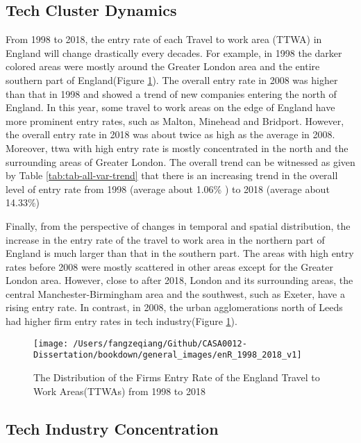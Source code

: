 \documentclass[
  12pt,
  oneside]{book}
\begin{document}
\hypertarget{tech-cluster-dynamics}{%
\subsection{Tech Cluster Dynamics}\label{tech-cluster-dynamics}}

From 1998 to 2018, the entry rate of each Travel to work area (TTWA) in England will change drastically every decades. For example, in 1998 the darker colored areas were mostly around the Greater London area and the entire southern part of England(Figure \ref{fig:fig-enR-1998-2018-v1}). The overall entry rate in 2008 was higher than that in 1998 and showed a trend of new companies entering the north of England. In this year, some travel to work areas on the edge of England have more prominent entry rates, such as Malton, Minehead and Bridport. However, the overall entry rate in 2018 was about twice as high as the average in 2008. Moreover, ttwa with high entry rate is mostly concentrated in the north and the surrounding areas of Greater London. The overall trend can be witnessed as given by Table \ref{tab:tab-all-var-trend} that there is an increasing trend in the overall level of entry rate from 1998 (average about 1.06\% ) to 2018
(average about 14.33\%)

Finally, from the perspective of changes in temporal and spatial distribution, the increase in the entry rate of the travel to work area in the northern part of England is much larger than that in the southern part. The areas with high entry rates before 2008 were mostly scattered in other areas except for the Greater London area. However, close to after 2018, London and its surrounding areas, the central Manchester-Birmingham area and the southwest, such as Exeter, have a rising entry rate. In contrast, in 2008, the urban agglomerations north of Leeds had higher firm entry rates in tech industry(Figure \ref{fig:fig-enR-1998-2018-v1}).

\begin{figure}
\texttt{[image: /Users/fangzeqiang/Github/CASA0012-Dissertation/bookdown/general\_images/enR\_1998\_2018\_v1]} \caption{The Distribution of the Firms Entry Rate of the England Travel to Work Areas(TTWAs) from 1998 to 2018}\label{fig:fig-enR-1998-2018-v1}
\end{figure}

\hypertarget{tech-industry-concentration}{%
\subsection{Tech Industry Concentration}\label{tech-industry-concentration}}
\end{document}
